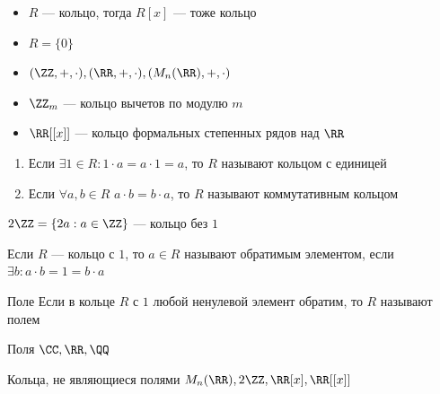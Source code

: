 \begin{example}{}{}
    \begin{itemize}
        \item
            \( R \) --- кольцо, тогда \( R[x] \) --- тоже кольцо
        \item
            \( R = \{ 0 \} \)
        \item
            \( (\ZZ, +, \cdot), (\RR, +, \cdot), (M_n(\RR), +, \cdot) \)
        \item
            \( \ZZ_m \) --- кольцо вычетов по модулю \( m \)
        \item
            \( \RR[[x]] \) --- кольцо формальных степенных рядов над \( \RR \)
    \end{itemize}
\end{example}

\begin{defn}{}{}
    \begin{enumerate}
        \item
            Если \( \exists 1 \in R : 1 \cdot a = a \cdot 1 = a \), то \( R \) называют кольцом с единицей
        \item
            Если \( \forall a, b \in R \) \( a \cdot b = b \cdot a \), то \( R \) называют коммутативным кольцом
    \end{enumerate}
\end{defn}

\begin{example}{}{}
    \( 2 \ZZ = \{ 2a : a \in \ZZ \} \) --- кольцо без \( 1 \)
\end{example}

\begin{defn}{}{}
    Если \( R \) --- кольцо с \( 1 \), то \( a \in R \) называют обратимым элементом, если \( \exists b : a \cdot b = 1 = b \cdot a \)
\end{defn}

\begin{defn}{Поле}{}
    Если в кольце \( R \) с \( 1 \) любой ненулевой элемент обратим, то \( R \) называют полем
\end{defn}

\begin{example}{Поля}{}
    \( \CC, \RR, \QQ \)
\end{example}

\begin{example}{Кольца, не являющиеся полями}{}
    \( M_n(\RR), 2\ZZ, \RR[x], \RR[[x]] \)
\end{example}

